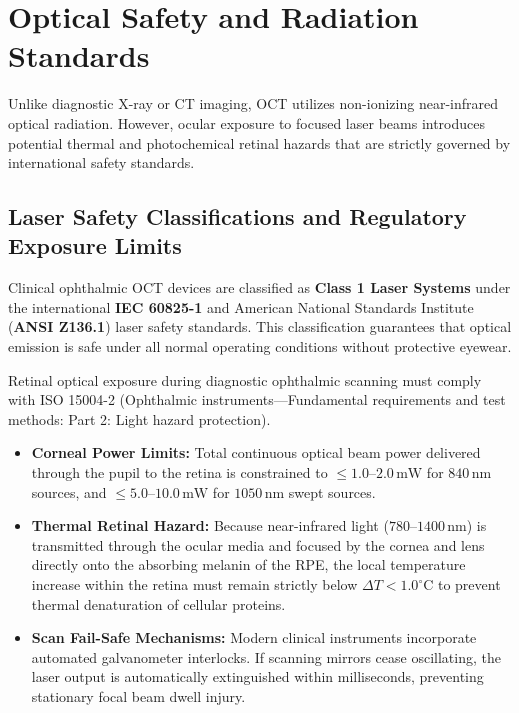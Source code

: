 \documentclass[11pt,a4paper]{article}
\begin{document}
\section{Optical Safety and Radiation Standards}

Unlike diagnostic X-ray or CT imaging, OCT utilizes non-ionizing near-infrared optical radiation. However, ocular exposure to focused laser beams introduces potential thermal and photochemical retinal hazards that are strictly governed by international safety standards.

\subsection{Laser Safety Classifications and Regulatory Exposure Limits}

Clinical ophthalmic OCT devices are classified as \textbf{Class 1 Laser Systems} under the international \textbf{IEC 60825-1} and American National Standards Institute (\textbf{ANSI Z136.1}) laser safety standards. This classification guarantees that optical emission is safe under all normal operating conditions without protective eyewear.

\begin{lasersafety}
Retinal optical exposure during diagnostic ophthalmic scanning must comply with ISO 15004-2 (Ophthalmic instruments—Fundamental requirements and test methods: Part 2: Light hazard protection).
\begin{itemize}[leftmargin=*]
    \item \textbf{Corneal Power Limits:} Total continuous optical beam power delivered through the pupil to the retina is constrained to $\le 1.0\text{--}2.0\,\text{mW}$ for $840\,\text{nm}$ sources, and $\le 5.0\text{--}10.0\,\text{mW}$ for $1050\,\text{nm}$ swept sources.
    \item \textbf{Thermal Retinal Hazard:} Because near-infrared light ($780\text{--}1400\,\text{nm}$) is transmitted through the ocular media and focused by the cornea and lens directly onto the absorbing melanin of the RPE, the local temperature increase within the retina must remain strictly below $\Delta T < 1.0^\circ\text{C}$ to prevent thermal denaturation of cellular proteins.
    \item \textbf{Scan Fail-Safe Mechanisms:} Modern clinical instruments incorporate automated galvanometer interlocks. If scanning mirrors cease oscillating, the laser output is automatically extinguished within milliseconds, preventing stationary focal beam dwell injury.
\end{itemize}
\end{lasersafety}
\end{document}
